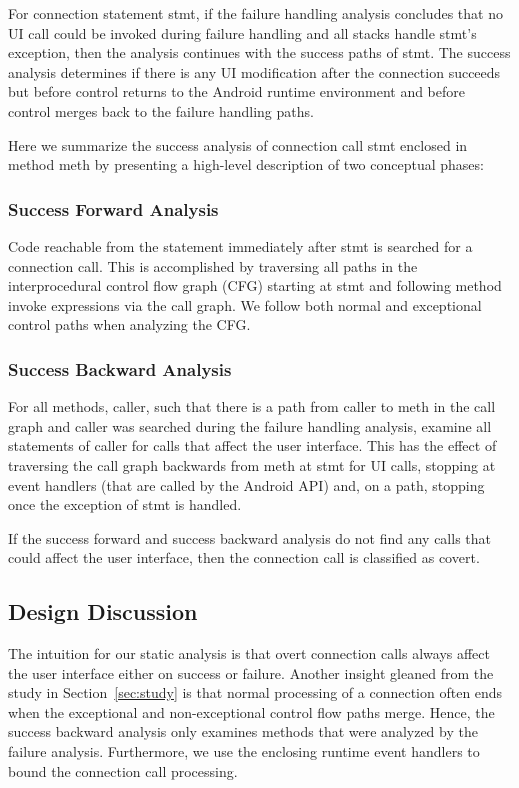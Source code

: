 For connection statement stmt, if the failure handling analysis
concludes that no UI call could be invoked during failure handling and
all stacks handle stmt's exception, then the analysis continues with
the success paths of stmt. The success analysis determines if there is
any UI modification after the connection succeeds but before control
returns to the Android runtime environment and before control merges
back to the failure handling paths.

Here we summarize the success analysis of connection call stmt enclosed
in method meth by presenting a high-level description of two conceptual
phases:

\subsubsection{Success Forward Analysis} Code reachable from the
  statement immediately after stmt is searched for a connection call.
  This is accomplished by traversing all paths in the interprocedural
  control flow graph (CFG) starting at stmt and following method invoke
  expressions via the call graph.  We follow both normal and
  exceptional control paths when analyzing the CFG.

\subsubsection{Success Backward Analysis} For all methods, caller, such
  that there is a path from caller to meth in the call graph and caller was
  searched during the failure handling analysis, examine all
  statements of caller for calls that affect the user interface.  This
  has the effect of traversing the call graph backwards from meth at
  stmt for UI calls, stopping at event handlers (that are called by the
  Android API) and, on a path, stopping once the exception of stmt is
  handled.

If the success forward and success backward analysis do not find any
calls that could affect the user interface, then the connection call
is classified as covert.

\subsection{Design Discussion}

The intuition for our static analysis is that overt connection calls
always affect the user interface either on success or
failure. 
Another insight gleaned from the study in Section~\ref{sec:study} is
that normal processing of a connection often ends when the exceptional and non-exceptional control
flow paths merge. Hence, 
the success backward analysis only examines methods
that were analyzed by the failure analysis.  
Furthermore, we use the enclosing runtime event handlers to bound the connection call processing.
 
